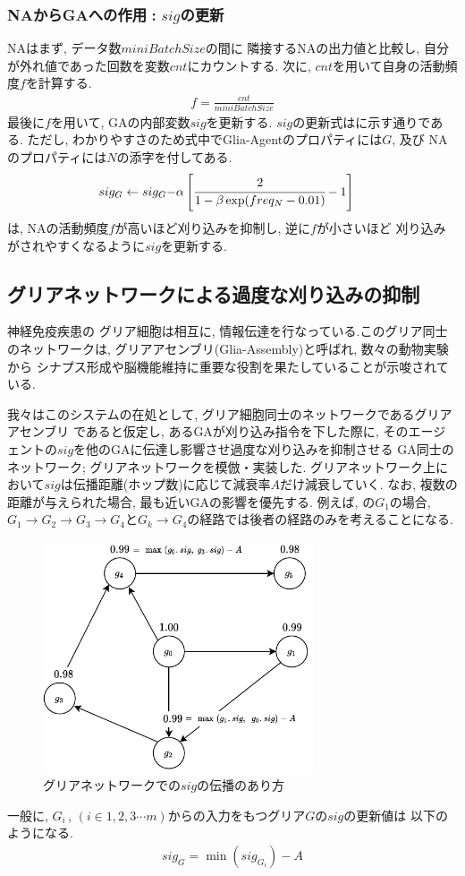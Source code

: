 \documentclass[a4paper, 10.5pt,twocolumn,dvipdfmx]{jsarticle}
\begin{document}
\subsubsection{NAからGAへの作用\,\,:\,\,$sig$の更新}
NAはまず, データ数$miniBatchSize$の間に
隣接するNAの出力値と比較し, 自分が外れ値であった回数を変数$cnt$にカウントする.
次に, $cnt$を用いて自身の活動頻度$f$を計算する.
\begin{align}
  f=\displaystyle\frac{cnt}{miniBatchSize}
\end{align}
最後に$f$を用いて, GAの内部変数$sig$を更新する.
$sig$の更新式はに示す通りである. 
ただし, わかりやすさのため式中でGlia-Agentのプロパティには$G$, 及び
NAのプロパティには$N$の添字を付してある.
\begin{align}
  sig_G\leftarrow sig_G-&\alpha\left[\cfrac{2}{1-\beta\exp(freq_N-0.01)}-1\right]
  \label{eq:sig}
\end{align}
は, NAの活動頻度$f$が高いほど刈り込みを抑制し, 逆に$f$が小さいほど
刈り込みがされやすくなるように$sig$を更新する.
\subsection{グリアネットワークによる過度な刈り込みの抑制}
神経免疫疾患の
グリア細胞は相互に, 情報伝達を行なっている.このグリア同士のネットワークは, 
グリアアセンブリ(Glia-Assembly)と呼ばれ, 数々の動物実験から
シナプス形成や脳機能維持に重要な役割を果たしていることが示唆されている. 

我々はこのシステムの在処として, グリア細胞同士のネットワークであるグリアアセンブリ
であると仮定し, あるGAが刈り込み指令を下した際に, 
そのエージェントの$sig$を他のGAに伝達し影響させ過度な刈り込みを抑制させる
GA同士のネットワーク; グリアネットワークを模倣・実装した.
グリアネットワーク上において$sig$は伝播距離(ホップ数)に応じて減衰率$A$だけ減衰していく.
なお, 複数の距離が与えられた場合, 最も近いGAの影響を優先する.
例えば, の$G_1$の場合, 
$G_1\rightarrow G_2\rightarrow G_3\rightarrow G_4$と$G_k\rightarrow G_4$の経路では後者の経路のみを考えることになる.
\vspace{-1.5zh}
\begin{figure}[H]
  \centering
  \includegraphics[width=8cm]{GliaNetworks.pdf}
  \caption{グリアネットワークでの$sig$の伝播のあり方}
  \label{fig:GliaNetworks}
\end{figure}
\vspace{-2zh}
一般に, $G_i \,,\,(i\in 1,2,3\cdots m)$からの入力をもつグリア$G$の$sig$の更新値は
以下のようになる.
\begin{align}
  sig_{G}=\min(sig_{G_i})-A
\end{align}
\end{document}
